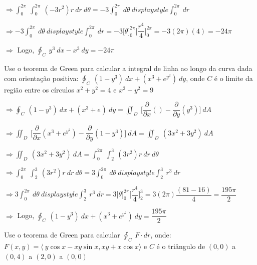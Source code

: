 \documentclass[11pt,a4paper]{article}
\begin{document}
\begin{enumerate}
{		$\Rightarrow \displaystyle\int_{0}^{2\pi}\ \displaystyle\int_{0}^{2\pi}\ (-3r^2)r\ dr\ d\theta = -3\displaystyle\int_{0}^{2\pi}\ d\theta\ displaystyle\int_{0}^{2\pi}\ dr$
		
		$\Rightarrow -3\displaystyle\int_{0}^{2\pi}\ d\theta\ displaystyle\int_{0}^{2\pi}\ dr = -3\Big[\theta\Big]_0^{2\pi}\Big[\dfrac{r^4}{4}\Big]_0^{2\pi} = -3(2\pi)(4) = -24\pi$
		
		$\Rightarrow$ Logo, $\displaystyle\oint_C\ y^3\ dx - x^3\ dy = -24\pi $
		
		\item Use o teorema de Green para calcular a integral de linha ao longo da curva dada com orientação positiva: $\displaystyle\oint_C\ (1 - y^3)\ dx + (x^3 + e^{y^2})\ dy$, onde $C$ é o limite da região entre os círculos $x^2 + y^2 = 4$ e $x^2 + y^2 = 9$
		
		$\Rightarrow \displaystyle\oint_C\ (1 - y^3)\ dx + (x^3 + e^{})\ dy = \displaystyle\iint_D\ \Bigg[\dfrac{\partial}{\partial x}() - \dfrac{\partial}{\partial y}(y^3)\Bigg]\ dA $ 
		
		$\Rightarrow \displaystyle\iint_D\ \Bigg[\dfrac{\partial}{\partial x}(x^3 + e^{y^2}) - \dfrac{\partial}{\partial y}(1 - y^3)\Bigg]\ dA = \displaystyle\iint_D\ (3x^2 + 3y^2)\ dA$
		
		$\Rightarrow \displaystyle\iint_D\ (3x^2 + 3y^2)\ dA =  \displaystyle\int_{0}^{2\pi}\ \displaystyle\int_{2}^{3}\ (3r^2)r\ dr\ d\theta$
		
		$\Rightarrow \displaystyle\int_{0}^{2\pi}\ \displaystyle\int_{2}^{3}\ (3r^2)r\ dr\ d\theta = 3\displaystyle\int_{0}^{2\pi}\ d\theta\ displaystyle\int_{2}^{3}\ r^3\ dr$
		
		$\Rightarrow 3\displaystyle\int_{0}^{2\pi}\ d\theta\ displaystyle\int_{2}^{3}\ r^3\ dr = 3\Big[\theta\Big]_0^{2\pi} \Bigg[\dfrac{r^4}{4}\Bigg]_2^3 = 3(2\pi) \dfrac{(81 - 16)}{4} = \dfrac{195\pi}{2}$
		
		$\Rightarrow$ Logo, $\displaystyle\oint_C\ (1 - y^3)\ dx + (x^3 + e^{y^2})\ dy = \dfrac{195\pi}{2}$
		
		\item Use o teorema de Green para calcular $\displaystyle\oint_C\ F \cdot dr$, onde: $F(x,y) = \langle\ y\cos x - xy\sin x, xy + x\cos x\rangle$ e $C$ é o triângulo de $(0,0)$ a $(0,4)$ a $(2,0)$ a $(0,0)$
		
}
\end{enumerate}
\end{document}
